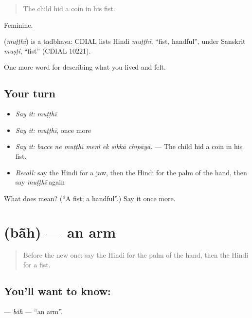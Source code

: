 \begin{quote}
The child hid a coin in his fist.
\end{quote}

Feminine.

\begin{cousinweb}
\textbf{} (\emph{muṭṭhī}) is a tadbhava: CDIAL lists Hindi \emph{muṭṭhī}, \textquotedblleft{}fist, handful\textquotedblright{}, under Sanskrit \emph{muṣṭí}, \textquotedblleft{}fist\textquotedblright{} (CDIAL 10221).
\end{cousinweb}

\begin{grammarlens}[title={What you've built}]
One more word for describing what you lived and felt.
\end{grammarlens}

\subsection*{Your turn}
\begin{itemize}
\raggedright
  \item \emph{Say it:} \emph{muṭṭhī}
  \item \emph{Say it:} \emph{muṭṭhī}, once more
  \item \emph{Say it:} \emph{bacce ne muṭṭhī meṁ ek sikkā chipāyā.} — The child hid a coin in his fist.
  \item \emph{Recall:} say the Hindi for a jaw, then the Hindi for the palm of the hand, then say \emph{muṭṭhī} again
\end{itemize}

\begin{tcolorbox}[breakable,colback=teal!4,colframe=teal!35!black,title={Before you move on}]
What does  mean? (\textquotedblleft{}A fist; a handful\textquotedblright{}.) Say it once more.
\end{tcolorbox}
\section[\texorpdfstring{\hi{बाँह} (bā̃h)}{बाँह (bā̃h)}]{ (bā̃h) — an arm}

\label{lesson:HI-C477-bah}



\begin{quote}
Before the new one: say the Hindi for the palm of the hand, then the Hindi for a fist.
\end{quote}

\subsection*{You'll want to know: }
\textbf{} — \emph{bā̃h} — \textquotedblleft{}an arm\textquotedblright{}.

